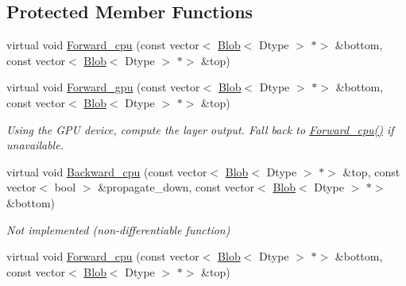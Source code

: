 \subsection*{Protected Member Functions}
\begin{DoxyCompactItemize}
\item 
virtual void \mbox{\hyperlink{classcaffe_1_1_threshold_layer_a7aa846dd532cfeb41b09671bd975d120}{Forward\+\_\+cpu}} (const vector$<$ \mbox{\hyperlink{classcaffe_1_1_blob}{Blob}}$<$ Dtype $>$ $\ast$$>$ \&bottom, const vector$<$ \mbox{\hyperlink{classcaffe_1_1_blob}{Blob}}$<$ Dtype $>$ $\ast$$>$ \&top)
\item 
\mbox{\label{classcaffe_1_1_threshold_layer_aded9ca701625d915984c9f5ef754ba66}} 
virtual void \mbox{\hyperlink{classcaffe_1_1_threshold_layer_aded9ca701625d915984c9f5ef754ba66}{Forward\+\_\+gpu}} (const vector$<$ \mbox{\hyperlink{classcaffe_1_1_blob}{Blob}}$<$ Dtype $>$ $\ast$$>$ \&bottom, const vector$<$ \mbox{\hyperlink{classcaffe_1_1_blob}{Blob}}$<$ Dtype $>$ $\ast$$>$ \&top)
\begin{DoxyCompactList}\small\item\em Using the G\+PU device, compute the layer output. Fall back to \mbox{\hyperlink{classcaffe_1_1_threshold_layer_a7aa846dd532cfeb41b09671bd975d120}{Forward\+\_\+cpu()}} if unavailable. \end{DoxyCompactList}\item 
\mbox{\label{classcaffe_1_1_threshold_layer_a5df4d0e3da5e80d83c5853da0f018db6}} 
virtual void \mbox{\hyperlink{classcaffe_1_1_threshold_layer_a5df4d0e3da5e80d83c5853da0f018db6}{Backward\+\_\+cpu}} (const vector$<$ \mbox{\hyperlink{classcaffe_1_1_blob}{Blob}}$<$ Dtype $>$ $\ast$$>$ \&top, const vector$<$ bool $>$ \&propagate\+\_\+down, const vector$<$ \mbox{\hyperlink{classcaffe_1_1_blob}{Blob}}$<$ Dtype $>$ $\ast$$>$ \&bottom)
\begin{DoxyCompactList}\small\item\em Not implemented (non-\/differentiable function) \end{DoxyCompactList}\item 
virtual void \mbox{\hyperlink{classcaffe_1_1_threshold_layer_ab4750bfabc48f7bc76721dec81a3d54f}{Forward\+\_\+cpu}} (const vector$<$ \mbox{\hyperlink{classcaffe_1_1_blob}{Blob}}$<$ Dtype $>$ $\ast$$>$ \&bottom, const vector$<$ \mbox{\hyperlink{classcaffe_1_1_blob}{Blob}}$<$ Dtype $>$ $\ast$$>$ \&top)

\end{DoxyCompactItemize}
